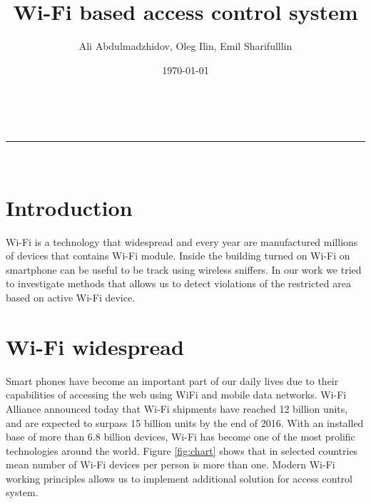 \documentclass[a4paper,11pt]{article}
\makeatletter
\newcommand*{\TitleFont}{%
      \usefont{\encodingdefault}{\rmdefault}{b}{n}%
      \fontsize{16}{20}%
      \selectfont}
\renewcommand{\maketitle}{
\begin{center}
\vspace{2ex}
{\huge \textsc{\TitleFont \@title}}
\vspace{1ex}
\\
\rule{\linewidth}{0.5pt}\\
\@author \hfill \@date
\vspace{4ex}
\end{center}
}
\makeatother
\begin{document}






\title{Wi-Fi based access control system}

\author{Ali Abdulmadzhidov, Oleg Ilin, Emil Sharifulllin}

\date{\today}

\maketitle
\tableofcontents

\section{Introduction}
Wi-Fi is a technology that widespread and every year are manufactured millions of devices that contains Wi-Fi module. Inside the building turned on Wi-Fi on smartphone can be useful to be track using wireless sniffers. In our work we tried to investigate methods that allows us to detect violations of the restricted area based on active Wi-Fi device.

\section{Wi-Fi widespread}
Smart phones have become an important part of our daily lives due to their capabilities of accessing the web using WiFi and mobile data networks. Wi-Fi Alliance announced today that Wi-Fi shipments have reached 12 billion units, and are expected to surpass 15 billion units by the end of 2016. With an installed base of more than 6.8 billion devices, Wi-Fi has become one of the most prolific technologies around the world. Figure \ref{fig:chart} shows that in selected countries mean number of Wi-Fi devices per person is more than one. Modern Wi-Fi working principles allows us to implement additional solution for access control system.
\end{document}
